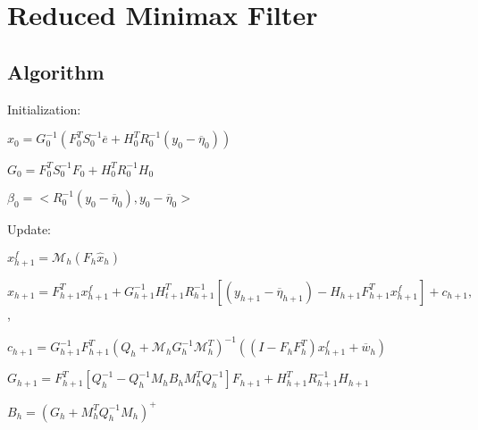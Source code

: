 \documentclass{tufte-book}
\begin{document}
\hypertarget{reduced_minimax_filter}{}\section{\-Reduced Minimax Filter}\label{reduced_minimax_filter}


\hypertarget{reduced_minimax_filter_algorithm_minimax_2}{}\subsection{\-Algorithm}\label{reduced_minimax_filter_algorithm_minimax_2}

\begin{DoxyEnumerate}
\item \-Initialization\-:
\begin{DoxyItemize}
\item $\hat x_0 = G^{-1}_0 \left(F_0^T S_0^{-1} \overline e + H_0^T R_0^{-1} (y_0- \overline \eta_0)\right)$\par

\item $G_0 = F_0^TS_0^{-1}F_0 + H_0^T R_0^{-1} H_0$\par

\item $\beta_0=< R_0^{-1} (y_0-\overline \eta_0),y_0-\overline \eta_0>$\par

\end{DoxyItemize}


\item \-Update\-:
\begin{DoxyItemize}
\item $ x_{h+1}^f={\mathcal M}_h(F_h\hat x_h) $\par

\item $\hat x_{h+1} = F_{h+1}^Tx_{h+1}^f + G^{-1}_{h+1}H^T_{t +1}R^{-1}_{h+1}[(y_{h+1}-\overline \eta_{h+1})-H_{h+1}F_{h+1}^T x_{h+1}^f] + c_{h+1}, $,\par

\item $c_{h+1} = G^{-1}_{h+1}F_{h+1}^T(Q_h+{\mathcal M}_hG_h^{-1}{\mathcal M}^T_h)^{-1}((I-F_hF_h^T)x_{h+1}^f+\overline w_h) $
\item $G_{h+1} = F_{h+1}^T \left[ Q_h^{-1} - Q_h^{-1} M_h B_h M_h^T Q^{-1}_h \right] F_{h+1} + H_{h+1}^T R_{h+1}^{-1} H_{h+1} $\par

\item $B_h = \left(G_h + M_h^T Q_h^{-1} M_h\right)^+ $\par


\end{DoxyItemize}
\end{DoxyEnumerate}
\end{document}
